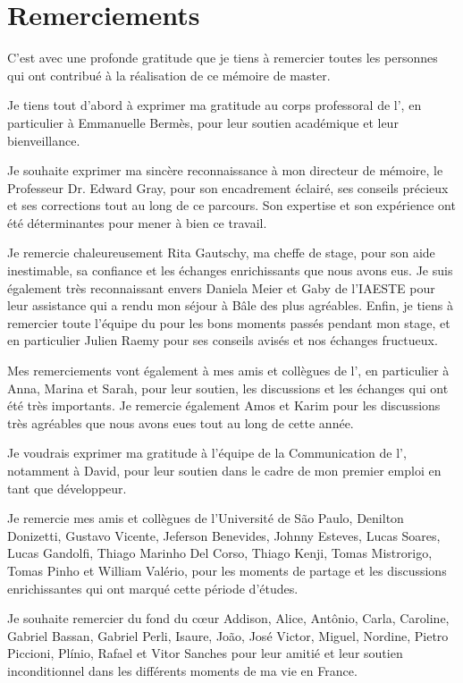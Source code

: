 \chapter{Remerciements}

C’est avec une profonde gratitude que je tiens à remercier toutes les personnes qui ont contribué à la réalisation de ce mémoire de master.

Je tiens tout d'abord à exprimer ma gratitude au corps professoral de l’\enc, en particulier à Emmanuelle Bermès, pour leur soutien académique et leur bienveillance.

Je souhaite exprimer ma sincère reconnaissance à mon directeur de mémoire, le Professeur Dr. Edward Gray, pour son encadrement éclairé, ses conseils précieux et ses corrections tout au long de ce parcours. Son expertise et son expérience ont été déterminantes pour mener à bien ce travail.

Je remercie chaleureusement Rita Gautschy, ma cheffe de stage, pour son aide inestimable, sa confiance et les échanges enrichissants que nous avons eus. Je suis également très reconnaissant envers Daniela Meier et Gaby de l’IAESTE pour leur assistance qui a rendu mon séjour à Bâle des plus agréables. Enfin, je tiens à remercier toute l’équipe du \dsc pour les bons moments passés pendant mon stage, et en particulier Julien Raemy pour ses conseils avisés et nos échanges fructueux.

Mes remerciements vont également à mes amis et collègues de l’\enc, en particulier à Anna, Marina et Sarah, pour leur soutien, les discussions et les échanges qui ont été très importants. Je remercie également Amos et Karim pour les discussions très agréables que nous avons eues tout au long de cette année.

Je voudrais exprimer ma gratitude à l’équipe de la Communication de l’\enc, notamment à David, pour leur soutien dans le cadre de mon premier emploi en tant que développeur.

Je remercie mes amis et collègues de l’Université de São Paulo, Denilton Donizetti, Gustavo Vicente, Jeferson Benevides, Johnny Esteves, Lucas Soares, Lucas Gandolfi, Thiago Marinho Del Corso, Thiago Kenji, Tomas Mistrorigo, Tomas Pinho et William Valério, pour les moments de partage et les discussions enrichissantes qui ont marqué cette période d’études.

Je souhaite remercier du fond du cœur Addison, Alice, Antônio, Carla, Caroline, Gabriel Bassan, Gabriel Perli, Isaure, João, José Victor, Miguel, Nordine, Pietro Piccioni, Plínio, Rafael et Vitor Sanches pour leur amitié et leur soutien inconditionnel dans les différents moments de ma vie en France.

